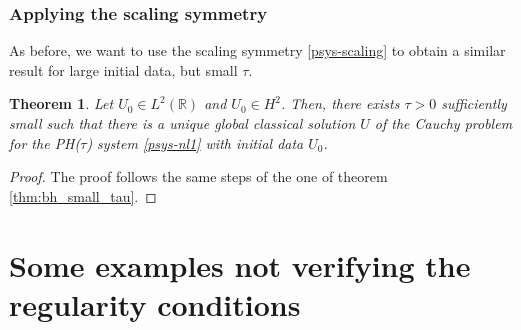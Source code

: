 \documentclass{article}
\theoremstyle{plain}
\newtheorem{theorem}{Theorem}
\theoremstyle{definition}
\numberwithin{theorem}{section}
\begin{document}
\subsubsection{Applying the scaling symmetry}
As before, we want to use   the scaling symmetry \eqref{psys-scaling} to obtain a similar result  for large initial data, but small $\tau$.
\begin{theorem}
\label{thm:psys_small_tau}
    Let
    $U_0 \in L^2(\mathbb{R})$ and
    $U_0 \in H^2$.
    Then, there exists $\tau > 0$ sufficiently small such that
    there is a unique global classical solution $U$ of the Cauchy problem for the PH($\tau$) system \eqref{psys-nl1}
    with initial data $U_0$.
\end{theorem}
\begin{proof}
The proof follows the same steps of the one of theorem \ref{thm:bh_small_tau}.
\end{proof}
%







\section{Some examples not verifying the regularity conditions}
\end{document}
